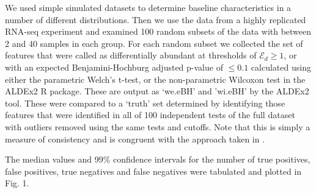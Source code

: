 We used  simple simulated datasets to determine baseline characteristics in a number of different distributions. Then we use the data  from a highly replicated RNA-seq experiment \citep{Schurch:2016aa} and examined 100 random subsets of the data with between 2 and 40 samples in each group. For each random subset we collected the set of features that were called as differentially abundant at thresholds of $\mathcal{E}_{d} \ge 1$, or with an expected Benjamini-Hochburg adjusted p-value of $\le 0.1$ calculated using either the parametric Welch's t-test, or the non-parametric Wilcoxon test in the ALDEx2 R package. These are output as `we.eBH' and 'wi.eBH' by the ALDEx2 tool. These were compared to a `truth' set determined by identifying those features that were identified in all of 100 independent tests of the full dataset with outliers removed using the same tests and cutoffs. Note that this is simply a measure of consistency and is congruent with the approach taken in \citep{Schurch:2016aa}.

The median values and 99\% confidence intervals for the number of true positives, false positives, true negatives and false negatives were tabulated and plotted in Fig. 1.  
